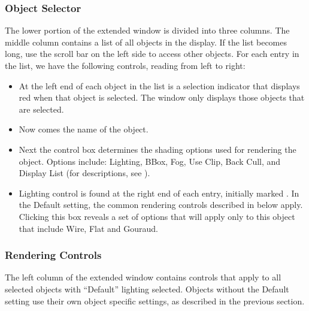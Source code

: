 \subsubsection{Object Selector}

The lower portion of the extended \viewer{} window is divided into three
columns. The middle column contains a list of all objects in the
display.  If the list becomes long, use the scroll bar on the left
side to access other objects.  For each entry in the list, we have
the following controls, reading from left to right:

\begin{itemize}
  \item At the left end of each object
        in the list is a selection indicator that displays red
        when that object is 
        selected.  The \viewer{} window only displays those objects that
        are selected.
  \item Now comes the name of the object.
  \item Next the  control box determines the
        shading options used for rendering the object.
        Options include: Lighting, BBox, Fog, Use Clip, Back Cull, and
        Display List (for descriptions, see
        ).
  \item Lighting control is found at the right end of each entry, initially
        marked .  In the Default setting, the common
        rendering controls described in  below apply.  Clicking this box
        reveals a set of options that will apply only to this object that
        include Wire, Flat and Gouraud.
\end{itemize}


\subsubsection{Rendering Controls}
\label{sec:view-rendering} 

The left column of the extended \viewer{} window contains controls that
apply to all selected objects with ``Default'' lighting selected.
Objects without the Default setting use their own object specific
settings, as described in the previous section.  


